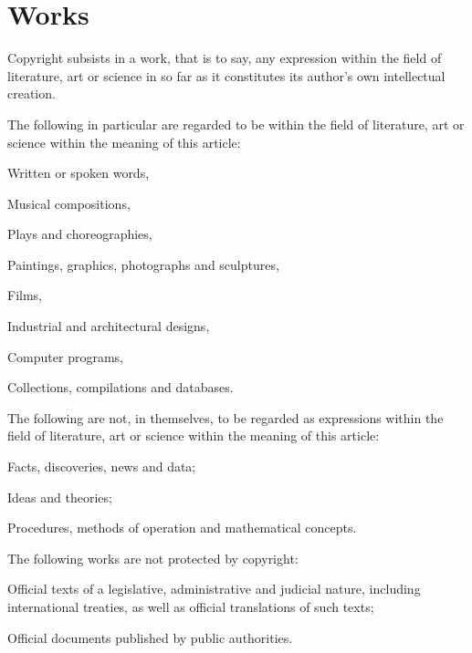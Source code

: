 \section{Works}
\begin{contract}

\label{Par:Works}
\Sentence Copyright subsists in a work, that is to say, any expression within the
field of literature, art or science in so far as it constitutes its author's
own intellectual creation.

\Sentence The following in particular are regarded to be within the field of literature,
art or science within the meaning of this article:
\begin{legalenum}
	\item Written or spoken words,
	\item Musical compositions,
	\item Plays and choreographies,
	\item Paintings, graphics, photographs and sculptures,
	\item Films,
	\item Industrial and architectural designs,
	\item Computer programs,
	\item Collections, compilations and databases.
\end{legalenum}

\Sentence The following are not, in themselves, to be regarded as expressions within
the field of literature, art or science within the meaning of this article:
\begin{legalenum}
	\item Facts, discoveries, news and data;\samepage
	\item Ideas and theories;
	\item Procedures, methods of operation and mathematical concepts.
\end{legalenum}

\label{Par:ExcludedWorks}
\Sentence The following works are not protected by copyright:
\begin{legalenum}
	\item Official texts of a legislative, administrative and judicial nature, including
				international treaties, as well as official translations of such texts;
	\item Official documents published by public authorities.
\end{legalenum}

\end{contract}

